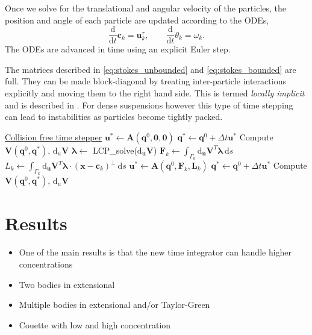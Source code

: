 \documentclass[preprint, 10pt]{elsarticle}
\begin{document}
Once we solve for the translational and angular velocity of the
particles, the position and angle of each particle are updated according
to the ODEs,
\[ \frac{\text{d}}{\text{d}t}\mathbf{c}_k = \mathbf{u}^\tau_k, \qquad \frac{\text{d}}{\text{d}t}\theta_k =\omega_k.\]
The ODEs are advanced in time using an explicit Euler step. 

The matrices described in \eqref{eq:stokes_unbounded} and
\eqref{eq:stokes_bounded} are full. They can be made block-diagonal by
treating inter-particle interactions explicitly and moving them to the
right hand side. This is termed {\em locally implicit} and is described
in \cite{Lu2017}. For dense suspensions however this type of time
stepping can lead to instabilities as particles become tightly packed. 

\begin{algorithm}

  	  \underline{Collision free time stepper}\;
	 $\mathbf{u}^* \gets \mathbf{A}(\mathbf{q}^0,\mathbf{0},\mathbf{0})$\;
	$\mathbf{q}^* \gets \mathbf{q}^0 + \Delta t \mathbf{u}^*$\;
	Compute $\mathbf{V}(\mathbf{q}^0,\mathbf{q}^*)$, $\text{d}_u\mathbf{V}$\;
	{
		$\pmb{\lambda} \gets$ LCP\_solve($\text{d}_{\mathbf{u}}\mathbf{V}$)\;
		$\mathbf{F}_k \gets \int_{\Gamma_k} \text{d}_{\mathbf{u}}\mathbf{V}^T\pmb{\lambda}~\text{d}s$\;
		$L_k \gets \int_{\Gamma_k} \text{d}_{\mathbf{u}}\mathbf{V}^T\pmb{\lambda}\cdot(\mathbf{x}-\mathbf{c}_k)^\perp~\text{d}s$\;
		$\mathbf{u}^* \gets \mathbf{A}(\mathbf{q}^0,\mathbf{F}_k,\mathbf{L}_k)$\;
		$\mathbf{q}^* \gets \mathbf{q}^0 + \Delta t \mathbf{u}^*$\;
		Compute $\mathbf{V}(\mathbf{q}^0,\mathbf{q}^*)$, $\text{d}_u\mathbf{V}$\;
	}
\end{algorithm}

\section{Results\label{s:results}} 

\begin{itemize}
  \item One of the main results is that the new time integrator can
    handle higher concentrations
  \item Two bodies in extensional
  \item Multiple bodies in extensional and/or Taylor-Green
  \item Couette with low and high concentration
\end{itemize}
\end{document}
